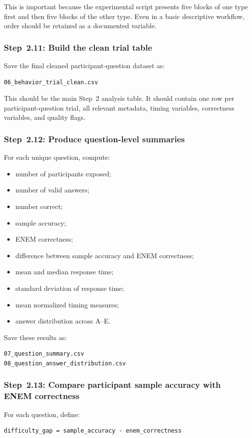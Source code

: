 This is important because the experimental script presents five blocks of one type first and then five blocks of the other type.
Even in a basic descriptive workflow, order should be retained as a documented variable.

\subsubsection{Step~2.11: Build the clean trial table}
Save the final cleaned participant-question dataset as:
\begin{verbatim}
06_behavior_trial_clean.csv
\end{verbatim}

This should be the main Step~2 analysis table.
It should contain one row per participant-question trial, all relevant metadata, timing variables, correctness variables, and quality flags.

\subsubsection{Step~2.12: Produce question-level summaries}
For each unique question, compute:
\begin{itemize}
    \item number of participants exposed;
    \item number of valid answers;
    \item number correct;
    \item sample accuracy;
    \item ENEM correctness;
    \item difference between sample accuracy and ENEM correctness;
    \item mean and median response time;
    \item standard deviation of response time;
    \item mean normalized timing measures;
    \item answer distribution across A--E.
\end{itemize}

Save these results as:
\begin{verbatim}
07_question_summary.csv
08_question_answer_distribution.csv
\end{verbatim}

\subsubsection{Step~2.13: Compare participant sample accuracy with ENEM correctness}
For each question, define:
\begin{verbatim}
difficulty_gap = sample_accuracy - enem_correctness
\end{verbatim}

